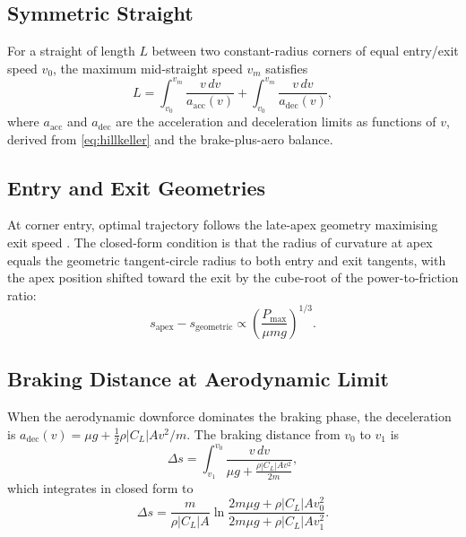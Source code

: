 \documentclass[11pt,twocolumn]{article}
\theoremstyle{definition}
\theoremstyle{remark}
\begin{document}
\subsection{Symmetric Straight}

For a straight of length $L$ between two constant-radius corners of equal entry/exit speed $v_0$, the maximum mid-straight speed $v_m$ satisfies
\begin{equation}
L = \int_{v_0}^{v_m} \frac{v\,dv}{a_{\mathrm{acc}}(v)} + \int_{v_0}^{v_m} \frac{v\,dv}{a_{\mathrm{dec}}(v)},
\end{equation}
where $a_{\mathrm{acc}}$ and $a_{\mathrm{dec}}$ are the acceleration and deceleration limits as functions of $v$, derived from \eqref{eq:hillkeller} and the brake-plus-aero balance.

\subsection{Entry and Exit Geometries}

At corner entry, optimal trajectory follows the late-apex geometry maximising exit speed \cite{milliken1995race,beckman1991physics}. The closed-form condition is that the radius of curvature at apex equals the geometric tangent-circle radius to both entry and exit tangents, with the apex position shifted toward the exit by the cube-root of the power-to-friction ratio:
\begin{equation}
s_{\mathrm{apex}} - s_{\mathrm{geometric}} \propto \left(\frac{P_{\max}}{\mu m g}\right)^{1/3}.
\end{equation}

\subsection{Braking Distance at Aerodynamic Limit}

When the aerodynamic downforce dominates the braking phase, the deceleration is $a_{\mathrm{dec}}(v) = \mu g + \tfrac{1}{2}\rho |C_L| A v^2 / m$. The braking distance from $v_0$ to $v_1$ is
\begin{equation}
\Delta s = \int_{v_1}^{v_0} \frac{v\,dv}{\mu g + \tfrac{\rho |C_L| A v^2}{2m}},
\end{equation}
which integrates in closed form to
\begin{equation}
\Delta s = \frac{m}{\rho |C_L| A} \ln\frac{2 m \mu g + \rho |C_L| A v_0^2}{2 m \mu g + \rho |C_L| A v_1^2}.
\end{equation}
\end{document}
